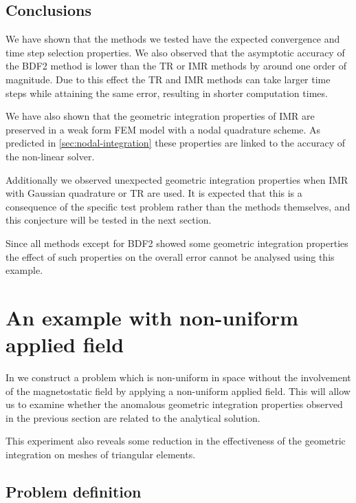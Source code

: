 \subsection{Conclusions}

We have shown that the methods we tested have the expected convergence and time step selection properties.
\label{cpu-correction-2}
We also observed that the asymptotic accuracy of the BDF2 method is lower than the TR or IMR methods by around one order of magnitude.
Due to this effect the TR and IMR methods can take larger time steps while attaining the same error, resulting in shorter computation times.

We have also shown that the geometric integration properties of IMR are preserved in a weak form FEM model with a nodal quadrature scheme.
As predicted in \cref{sec:nodal-integration} these properties are linked to the accuracy of the non-linear solver.

Additionally we observed unexpected geometric integration properties when IMR with Gaussian quadrature or TR are used.
It is expected that this is a consequence of the specific test problem rather than the methods themselves, and this conjecture will be tested in the next section.

Since all methods except for BDF2 showed some geometric integration properties the effect of such properties on the overall error cannot be analysed using this example.


\FloatBarrier
\section{An example with non-uniform applied field}
\label{sec:non-uniform-applied}

In  we construct a problem which is non-uniform in space without the involvement of the magnetostatic field by applying a non-uniform applied field.
This will allow us to examine whether the anomalous geometric integration properties observed in the previous section are related to the analytical solution.

This experiment also reveals some reduction in the effectiveness of the geometric integration on meshes of triangular elements.

\subsection{Problem definition}

